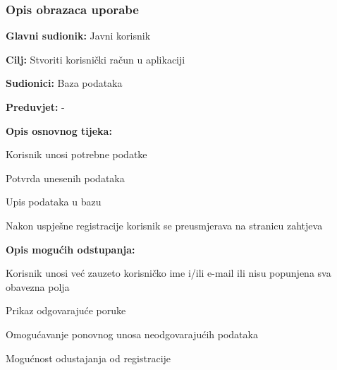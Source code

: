				\subsubsection{Opis obrazaca uporabe}
					\noindent {}
					\begin{packed_item}
						
						\item \textbf{Glavni sudionik: }Javni korisnik
						\item  \textbf{Cilj:} Stvoriti korisnički račun u aplikaciji
						\item  \textbf{Sudionici:} Baza podataka
						\item  \textbf{Preduvjet:} -
						\item  \textbf{Opis osnovnog tijeka:}
						
						\item[] \begin{packed_enum}
							
							\item Korisnik unosi potrebne podatke
							\item Potvrda unesenih podataka
							\item Upis podataka u bazu
							\item Nakon uspješne registracije korisnik se preusmjerava na stranicu zahtjeva
						\end{packed_enum}
						
						\item  \textbf{Opis mogućih odstupanja:}
						
						\item[] \begin{packed_item}
							
							\item[1.a] Korisnik unosi već zauzeto korisničko ime i/ili e-mail ili nisu popunjena sva obavezna polja
							\item[] \begin{packed_enum}
								
								\item Prikaz odgovarajuće poruke
								\item Omogućavanje ponovnog unosa neodgovarajućih podataka
								
							\end{packed_enum}
							
							\item[4.a] Mogućnost odustajanja od registracije
							
						\end{packed_item}
					\end{packed_item}
				

